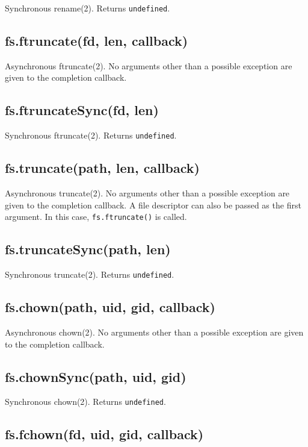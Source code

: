 Synchronous rename(2). Returns \texttt{undefined}.

\subsection{fs.ftruncate(fd, len,
callback)}\label{fs.ftruncatefd-len-callback}

Asynchronous ftruncate(2). No arguments other than a possible exception
are given to the completion callback.

\subsection{fs.ftruncateSync(fd, len)}\label{fs.ftruncatesyncfd-len}

Synchronous ftruncate(2). Returns \texttt{undefined}.

\subsection{fs.truncate(path, len,
callback)}\label{fs.truncatepath-len-callback}

Asynchronous truncate(2). No arguments other than a possible exception
are given to the completion callback. A file descriptor can also be
passed as the first argument. In this case, \texttt{fs.ftruncate()} is
called.

\subsection{fs.truncateSync(path, len)}\label{fs.truncatesyncpath-len}

Synchronous truncate(2). Returns \texttt{undefined}.

\subsection{fs.chown(path, uid, gid,
callback)}\label{fs.chownpath-uid-gid-callback}

Asynchronous chown(2). No arguments other than a possible exception are
given to the completion callback.

\subsection{fs.chownSync(path, uid,
gid)}\label{fs.chownsyncpath-uid-gid}

Synchronous chown(2). Returns \texttt{undefined}.

\subsection{fs.fchown(fd, uid, gid,
callback)}\label{fs.fchownfd-uid-gid-callback}

